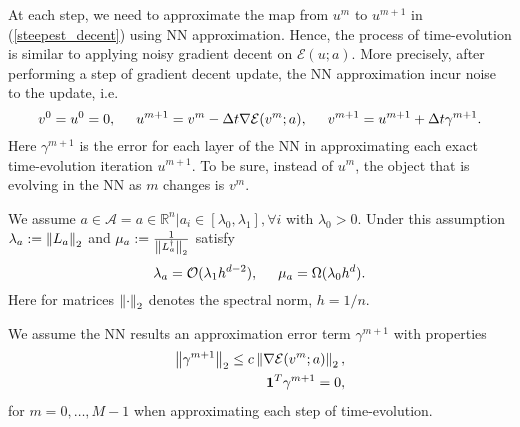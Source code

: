 At each step, we need to approximate the map from $u^m$ to $u^{m+1}$ in (\ref{steepest_decent}) using NN approximation. Hence, the process of time-evolution is similar to applying noisy gradient decent on $\mathcal{E}(u;a)$. More precisely, after performing a step of gradient decent update, the NN approximation incur noise to the update, i.e.
\begin{equation}
	\label{eq:iterationschema_noisy_steepest_decent}
	v^0 = u^0 = 0,\hspace*{.5cm} u^{m+1} = v^m - \Delta t \nabla \mathcal{E}(v^m;a),\hspace*{.5cm} v^{m+1} = u^{m+1} + \Delta t \gamma^{m+1}.
\end{equation}
Here $\gamma^{m+1}$ is the error for each layer of the NN in approximating each exact time-evolution iteration $u^{m+1}$. To be sure, instead of $u^{m}$, the object that is evolving in the NN as $m$ changes is $v^m$.
\begin{assumption}
	We assume $a\in \mathscr{A} = {a\in \mathbb{R}^n \vert a_i \in [\lambda_{0}, \lambda_{1}], \forall i }$ with $\lambda_{0} > 0$. Under this assumption $\lambda_{a} := \left\lVert L_a\right\rVert_{2}$ and $\mu_a := \frac{1}{\left\lVert L_{a}^{\dag}\right\rVert_2}$ satisfy
	\begin{equation}
		\label{ass:lambda_a_properties}
		\lambda_{a} = \mathcal{O}(\lambda_{1} h^{d-2}), \hspace*{.5cm} \mu_a = \Omega(\lambda_{0} h^d).
	\end{equation}
	Here for matrices $\left\lVert\cdot\right\rVert_{2}$ denotes the spectral norm, $h=1/n$. 
\end{assumption}
\begin{assumption}
	We assume the NN results an approximation error term $\gamma^{m+1}$ with properties
	\begin{eqnarray}
		\label{ass:ass2}
		\left\lVert\gamma^{m+1}\right\rVert_{2} \leq c \left\lVert\nabla \mathcal{E}(v^m;a)\right\rVert_{2}, \\
		\textbf{1}^T \gamma^{m+1} = 0, 
	\end{eqnarray}
	for $m=0,\dots ,M-1$ when approximating each step of time-evolution.
\end{assumption}
